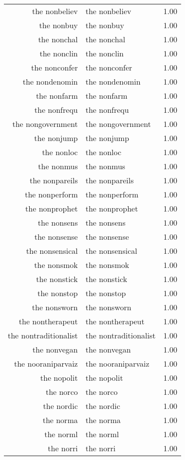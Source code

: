 \begin{table}[ht]
\begin{tabular}{rlr}
  the nonbeliev & the nonbeliev & 1.00 \\ 
  the nonbuy & the nonbuy & 1.00 \\ 
  the nonchal & the nonchal & 1.00 \\ 
  the nonclin & the nonclin & 1.00 \\ 
  the nonconfer & the nonconfer & 1.00 \\ 
  the nondenomin & the nondenomin & 1.00 \\ 
  the nonfarm & the nonfarm & 1.00 \\ 
  the nonfrequ & the nonfrequ & 1.00 \\ 
  the nongovernment & the nongovernment & 1.00 \\ 
  the nonjump & the nonjump & 1.00 \\ 
  the nonloc & the nonloc & 1.00 \\ 
  the nonmus & the nonmus & 1.00 \\ 
  the nonpareils & the nonpareils & 1.00 \\ 
  the nonperform & the nonperform & 1.00 \\ 
  the nonprophet & the nonprophet & 1.00 \\ 
  the nonsens & the nonsens & 1.00 \\ 
  the nonsense & the nonsense & 1.00 \\ 
  the nonsensical & the nonsensical & 1.00 \\ 
  the nonsmok & the nonsmok & 1.00 \\ 
  the nonstick & the nonstick & 1.00 \\ 
  the nonstop & the nonstop & 1.00 \\ 
  the nonsworn & the nonsworn & 1.00 \\ 
  the nontherapeut & the nontherapeut & 1.00 \\ 
  the nontraditionalist & the nontraditionalist & 1.00 \\ 
  the nonvegan & the nonvegan & 1.00 \\ 
  the nooraniparvaiz & the nooraniparvaiz & 1.00 \\ 
  the nopolit & the nopolit & 1.00 \\ 
  the norco & the norco & 1.00 \\ 
  the nordic & the nordic & 1.00 \\ 
  the norma & the norma & 1.00 \\ 
  the norml & the norml & 1.00 \\ 
  the norri & the norri & 1.00 \\ 

\end{tabular}
\end{table}

